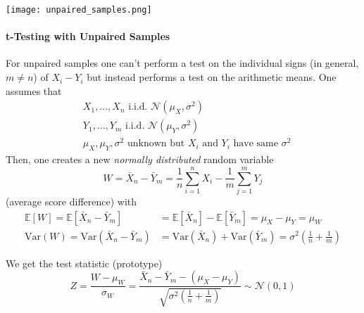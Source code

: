 \begin{center}
    \texttt{[image: unpaired\_samples.png]}
\end{center}

\paragraph{t-Testing with Unpaired Samples}

\newpar{}

For unpaired samples one can't perform a test on the individual signs (in general, $m\neq n$) of $X_i-Y_i$ but instead performs a test on the arithmetic means. One assumes that
\begin{align*}
     & X_1,\dots,X_n\text{ i.i.d. }\mathcal{N}(\mu_X,\sigma^2)                       \\
     & Y_1,\dots,Y_m\text{ i.i.d. }\mathcal{N}(\mu_Y,\sigma^2)                       \\
     & \mu_X,\mu_Y,\sigma^2 \text{ unknown but $X_i$ and $Y_i$ have same $\sigma^2$}
\end{align*}
Then, one creates a new \textit{normally distributed} random variable
\begin{equation*}
    W = \bar{X}_n-\bar{Y}_m=\frac{1}{n}\sum_{i=1}^{n} X_i-\frac{1}{m}\sum_{j=1}^{m} Y_j
\end{equation*}
(average score difference) with
\begin{align*}
    \mathbb{E}[W]=\mathbb{E}[\bar{X}_n-\bar{Y}_m]       & =\mathbb{E}[\bar{X}_n]-\mathbb{E}[\bar{Y}_m]=\mu_X-\mu_Y = \mu_W                              \\
    \mathrm{Var}(W) = \mathrm{Var}(\bar{X}_n-\bar{Y}_m) & =\mathrm{Var}(\bar{X}_n)+\mathrm{Var}(\bar{Y}_m)=\sigma^2\left(\frac{1}{n}+\frac{1}{m}\right)
\end{align*}

\newpar{}

We get the test statistic (prototype)
\begin{equation*}
    Z=\frac{W-\mu_W}{\sigma_W}=\frac{\bar{X}_n-\bar{Y}_m-(\mu_X-\mu_Y)}{\sqrt{\sigma^2\left(\frac{1}{n}+\frac{1}{m}\right)}}\sim\mathcal{N}(0,1)
\end{equation*}

